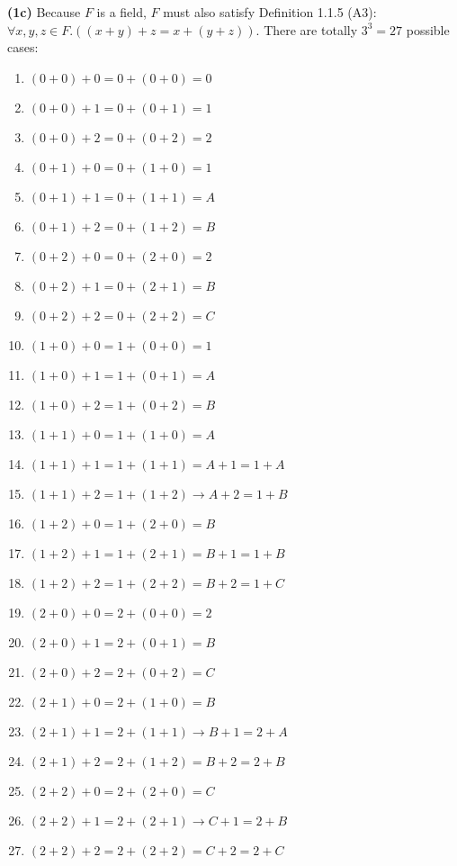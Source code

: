 \documentclass[12pt, letterpaper, oneside]{book}
\begin{document}
\textbf{(1c)} Because $F$ is a field, $F$ must also satisfy Definition 1.1.5 (A3): $\forall x, y, z \in F. ((x + y) + z
  = x + (y + z))$. There are totally $3^3 = 27$ possible cases:
\begin{enumerate}
  \item $(0 + 0) + 0 = 0 + (0 + 0) = 0$
  \item $(0 + 0) + 1 = 0 + (0 + 1) = 1$
  \item $(0 + 0) + 2 = 0 + (0 + 2) = 2$
  \item $(0 + 1) + 0 = 0 + (1 + 0) = 1$
  \item $(0 + 1) + 1 = 0 + (1 + 1) = A$
  \item $(0 + 1) + 2 = 0 + (1 + 2) = B$
  \item $(0 + 2) + 0 = 0 + (2 + 0) = 2$
  \item $(0 + 2) + 1 = 0 + (2 + 1) = B$
  \item $(0 + 2) + 2 = 0 + (2 + 2) = C$
  \item $(1 + 0) + 0 = 1 + (0 + 0) = 1$
  \item $(1 + 0) + 1 = 1 + (0 + 1) = A$
  \item $(1 + 0) + 2 = 1 + (0 + 2) = B$
  \item $(1 + 1) + 0 = 1 + (1 + 0) = A$
  \item $(1 + 1) + 1 = 1 + (1 + 1) = A + 1 = 1 + A$
  \item $(1 + 1) + 2 = 1 + (1 + 2) \rightarrow A + 2 = 1 + B$
  \item $(1 + 2) + 0 = 1 + (2 + 0) = B$
  \item $(1 + 2) + 1 = 1 + (2 + 1) = B + 1 = 1 + B$
  \item $(1 + 2) + 2 = 1 + (2 + 2) = B + 2 = 1 + C$
  \item $(2 + 0) + 0 = 2 + (0 + 0) = 2$
  \item $(2 + 0) + 1 = 2 + (0 + 1) = B$
  \item $(2 + 0) + 2 = 2 + (0 + 2) = C$
  \item $(2 + 1) + 0 = 2 + (1 + 0) = B$
  \item $(2 + 1) + 1 = 2 + (1 + 1) \rightarrow B + 1 = 2 + A$
  \item $(2 + 1) + 2 = 2 + (1 + 2) = B + 2 = 2 + B$
  \item $(2 + 2) + 0 = 2 + (2 + 0) = C$
  \item $(2 + 2) + 1 = 2 + (2 + 1) \rightarrow C + 1 = 2 + B$
  \item $(2 + 2) + 2 = 2 + (2 + 2) = C + 2 = 2 + C$
\end{enumerate}
\end{document}
